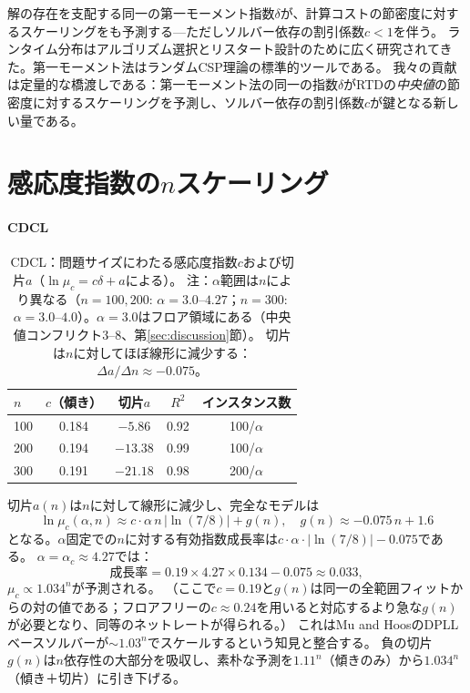 \documentclass[11pt,a4paper]{article}
\newcommand{\mc}{\mu_c}
\begin{document}
解の存在を支配する同一の第一モーメント指数$\delta$が、計算コストの節密度に対するスケーリングをも予測する---ただしソルバー依存の割引係数$c < 1$を伴う。
ランタイム分布はアルゴリズム選択とリスタート設計のために広く研究されてきた\cite{Hoos1999,Frost1997,Gomes2000}。第一モーメント法はランダムCSP理論の標準的ツールである\cite{MPZ2009}。
我々の貢献は定量的な橋渡しである：第一モーメント法の同一の指数$\delta$がRTDの\emph{中央値}の節密度に対するスケーリングを予測し、ソルバー依存の割引係数$c$が鍵となる新しい量である。


\appendix

\section{感応度指数の$n$スケーリング}
\label{app:n_scaling}
\label{sec:n_scaling}

\paragraph{CDCL}

\begin{table}[h]
\centering
\begin{tabular}{lcccc}
\toprule
$n$ & $c$（傾き） & 切片$a$ & $R^2$ & インスタンス数 \\
\midrule
100 & 0.184 & $-5.86$  & 0.92 & 100/$\alpha$ \\
200 & 0.194 & $-13.38$ & 0.99 & 100/$\alpha$ \\
300 & 0.191 & $-21.18$ & 0.98 & 200/$\alpha$ \\
\bottomrule
\end{tabular}
\caption{CDCL：問題サイズにわたる感応度指数$c$および切片$a$（$\ln \mc = c\delta + a$による）。
注：$\alpha$範囲は$n$により異なる（$n = 100{,}200$: $\alpha = 3.0$--$4.27$；$n = 300$: $\alpha = 3.0$--$4.0$）。$\alpha = 3.0$はフロア領域にある（中央値コンフリクト3--8、第\ref{sec:discussion}節）。
切片は$n$に対してほぼ線形に減少する：$\Delta a / \Delta n \approx -0.075$。}
\label{tab:n_scaling}
\end{table}

切片$a(n)$は$n$に対して線形に減少し、完全なモデルは
\[
\ln \mc(\alpha, n) \approx c \cdot \alpha\, n\, |\!\ln(7/8)|
  + g(n), \quad g(n) \approx -0.075\, n + 1.6
\]
となる。$\alpha$固定での$n$に対する有効指数成長率は$c \cdot \alpha \cdot |\!\ln(7/8)| - 0.075$である。
$\alpha = \alpha_c \approx 4.27$では：
\[
\text{成長率} = 0.19 \times 4.27 \times 0.134 - 0.075
  \approx 0.033,
\]
$\mc \propto 1.034^n$が予測される。
（ここで$c = 0.19$と$g(n)$は同一の全範囲フィットからの対の値である；フロアフリーの$c \approx 0.24$を用いると対応するより急な$g(n)$が必要となり、同等のネットレートが得られる。）
これはMu and Hoos\cite{MuHoos2015}のDPLLベースソルバーが$\sim\! 1.03^n$でスケールするという知見と整合する。
負の切片$g(n)$は$n$依存性の大部分を吸収し、素朴な予測を$1.11^n$（傾きのみ）から$1.034^n$（傾き＋切片）に引き下げる。
\end{document}
